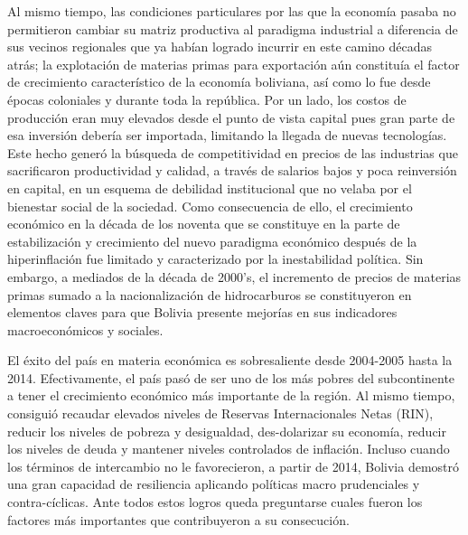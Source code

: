 \documentclass[12pt,letterpaper]{article}
\begin{document}
Al mismo tiempo, las condiciones particulares por las que la economía pasaba no permitieron cambiar su matriz productiva al paradigma industrial a diferencia de sus vecinos regionales que ya habían logrado incurrir en este camino décadas atrás; la explotación de materias primas para exportación aún constituía el factor de crecimiento característico de la economía boliviana, así como lo fue desde épocas coloniales y durante toda la república. Por un lado, los costos de producción eran muy elevados desde el punto de vista capital pues gran parte de esa inversión debería ser importada, limitando la llegada de nuevas tecnologías. Este hecho generó la búsqueda de competitividad en precios de las industrias que sacrificaron productividad y calidad, a través de salarios bajos y poca reinversión en capital, en un esquema de debilidad institucional que no velaba por el bienestar social de la sociedad. Como consecuencia de ello, el crecimiento económico en la década de los noventa que se constituye en la parte de estabilización y crecimiento del nuevo paradigma económico después de la hiperinflación fue limitado y caracterizado por la inestabilidad política. Sin embargo, a mediados de la década de 2000's, el incremento de precios de materias primas sumado a la nacionalización de hidrocarburos se constituyeron en elementos claves para que Bolivia presente mejorías en sus indicadores macroeconómicos y sociales.

El éxito del país en materia económica es sobresaliente desde 2004-2005 hasta la 2014. Efectivamente, el país pasó de ser uno de los más pobres del subcontinente a tener el crecimiento económico más importante de la región. Al mismo tiempo, consiguió recaudar elevados niveles de Reservas Internacionales Netas (RIN), reducir los niveles de pobreza y desigualdad, des-dolarizar su economía, reducir los niveles de deuda y mantener niveles controlados de inflación. Incluso cuando los términos de intercambio no le favorecieron, a partir de 2014, Bolivia demostró una gran capacidad de resiliencia aplicando políticas macro prudenciales y contra-cíclicas. Ante todos estos logros queda preguntarse cuales fueron los factores más importantes que contribuyeron a su consecución.
\end{document}

